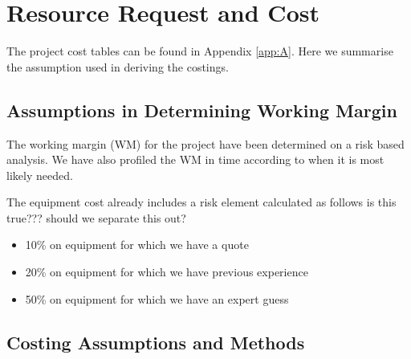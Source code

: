\section{Resource Request and Cost}

The project cost tables can be found in Appendix \ref{app:A}. Here we summarise the assumption used in deriving the costings.

\subsection{Assumptions in Determining Working Margin}

The working margin (WM) for the project have been determined on a risk based analysis. We have also profiled the WM in time according to when it is most likely needed.

The equipment cost already includes a risk element calculated as follows {\color{red} is this true??? should we separate this out?}
\begin{itemize}
    \item 10\% on equipment for which we have a quote
    \item 20\% on equipment for which we have previous experience
    \item 50\% on equipment for which we have an expert guess
\end{itemize}

\subsection{Costing Assumptions and Methods}

